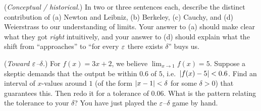 \begin{exercise}
(\emph{Conceptual / historical.}) In two or three sentences each, describe the distinct
contribution of (a) Newton and Leibniz, (b) Berkeley, (c) Cauchy, and (d) Weierstrass to our
understanding of limits. Your answer to (a) should make clear what they got \emph{right}
intuitively, and your answer to (d) should explain what the shift from ``approaches'' to ``for
every $\varepsilon$ there exists $\delta$'' buys us.
\end{exercise}

\begin{exercise}
(\emph{Toward $\varepsilon$--$\delta$.}) For $f(x) = 3x + 2$, we believe $\lim_{x\to 1} f(x) = 5$.
Suppose a skeptic demands that the output be within $0.6$ of $5$, i.e.\ $\lvert f(x) - 5\rvert < 0.6$.
Find an interval of $x$-values around $1$ (of the form $\lvert x - 1\rvert < \delta$ for some $\delta>0$)
that guarantees this. Then redo it for a tolerance of $0.06$. What is the pattern relating the
tolerance to your $\delta$? You have just played the $\varepsilon$--$\delta$ game by hand.
\end{exercise}
